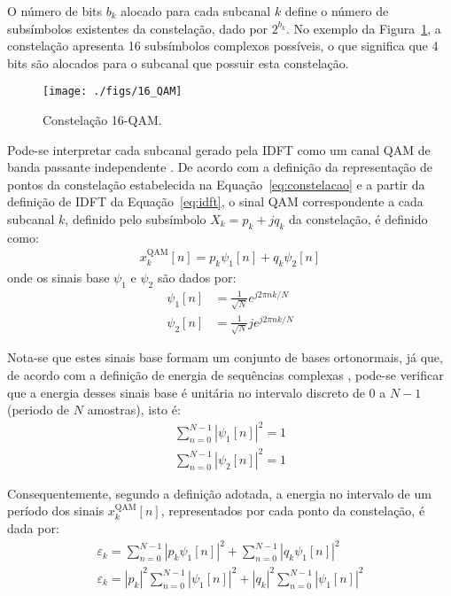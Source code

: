 O número de bits $b_k$ alocado para cada subcanal $k$ define o número de subsímbolos existentes da constelação, dado por $2^{b_k}$. No exemplo da Figura~\ref{fig:16_qam}, a constelação apresenta 16 subsímbolos complexos possíveis, o que significa que 4 bits são alocados para o subcanal que possuir esta constelação.
\begin{figure}[htbp]
\centering
\texttt{[image: ./figs/16\_QAM]}
\caption{Constelação 16-QAM.
\label{fig:16_qam}}
\end{figure}

Pode-se interpretar cada subcanal gerado pela IDFT como um canal QAM de banda passante independente \cite{fundamentalsDSLch7}. De acordo com a definição da representação de pontos da constelação estabelecida na Equação~\ref{eq:constelacao} e a partir da definição de IDFT da Equação~\ref{eq:idft}, o sinal QAM correspondente a cada subcanal $k$, definido pelo subsímbolo $X_k = p_k + jq_k$ da constelação, é definido como:
\begin{align}
x_k^\text{QAM}[n] = p_k \psi_1[n] +  q_k \psi_2[n]
\label{eq:x_t_k}
\end{align}
onde os sinais base $\psi_1$ e $\psi_2$ são dados por:
\begin{align}
\psi_{1}[n] &= \frac{1}{\sqrt{N}} e^{j2\pi n k/N}\\
\psi_{2}[n] &= \frac{1}{\sqrt{N}} je^{j2\pi n k/N}
\end{align}

Nota-se que estes sinais base formam um conjunto de bases ortonormais, já que, de acordo com a definição de energia de sequências complexas  \cite{proakisdsp}, pode-se verificar que a energia desses sinais base é unitária no intervalo discreto de $0$ a $N-1$ (periodo de $N$ amostras), isto é:
\begin{align}
\sum \limits_{n=0}^{N-1} \left| \psi_1[n] \right|^2=1\\
\sum \limits_{n=0}^{N-1} \left| \psi_2[n] \right|^2=1
\end{align}

Consequentemente, segundo a definição adotada, a energia no intervalo de um período dos sinais $x_k^\text{QAM}[n]$, representados por cada ponto da constelação, é dada por:
\begin{align}
\varepsilon_k = \sum \limits_{n=0}^{N-1} \left| p_k \psi_1[n] \right|^2 +  \sum \limits_{n=0}^{N-1} \left| q_k \psi_1[n] \right|^2 \nonumber \\
\varepsilon_k = \left| p_k \right|^2 \sum \limits_{n=0}^{N-1} \left| \psi_1[n] \right|^2 +  \left| q_k \right|^2 \sum \limits_{n=0}^{N-1} \left|\psi_1[n] \right|^2 \nonumber
\end{align}

